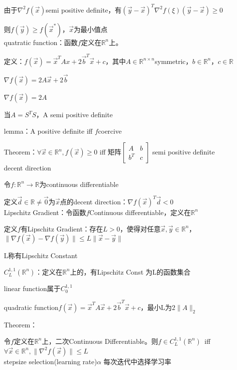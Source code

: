 \documentclass[UTF8]{ctexart}
\begin{document}
  \quad 由于$\nabla^2 f(\vec{x})$semi positive definite，有$(\vec{y} - \vec{x})^T\nabla^2 f(\xi) (\vec{y} - \vec{x}) \geq 0$

  \quad 则$f(\vec{y}) \geq f(\vec{x}^*)$，$\vec{x}$为最小值点\\
quatratic function：函数$f$定义在$\mathbb{R}^n$上。

  定义：$f(\vec{x}) = \vec{x}^TAx + 2\vec{b}^T\vec{x} + c$，其中$A \in \mathbb{R}^{n \times n}$symmetric，$b \in \mathbb{R}^n$，$c \in \mathbb{R} $

  \quad $\nabla f(\vec{x}) = 2A\vec{x} + 2\vec{b}$

  \quad $\nabla f(\vec{x}) = 2A$

  \quad 当$A = S^TS$，A semi positive definite

  lemma：A positive definite iff $f$coercive

  Theorem：$\forall \vec{x} \in \mathbb{R}^n, f(\vec{x}) \geq 0$ iff 矩阵$\begin{bmatrix}
    A & b \\
    b^T & c
    \end{bmatrix}$ semi positive definite\\
decent direction 

  令$f : \mathbb{R}^n \rightarrow \mathbb{R} $为continuous differentiable

  定义$\vec{d} \in \mathbb{R} \neq \vec{0}$为$\vec{x}$点的decent direction：$\nabla f(\vec{x})^T\vec{d} < 0$\\
Lipschitz Gradient：令函数$f$Continuous differentiable，定义在$\mathbb{R}^n$

  定义$f$有Lipschitz Gradient：存在$L > 0$，使得对任意$\vec{x}, \vec{y} \in \mathbb{R}^n$，$\|\nabla f(\vec{x}) - \nabla f(\vec{y})\| \leq L\|\vec{x} - \vec{y}\|$

  \quad L称有Lipschitz Constant

  $C^{1,1}_L(\mathbb{R}^n)$：定义在$\mathbb{R}^n$上的，有Lipschitz Const 为L的函数集合

  \quad linear function属于$C^{1,1}_0$

  \quad quadratic function$f(\vec{x}) = \vec{x}^TA\vec{x} + 2\vec{b}^T\vec{x} + c$，最小L为$2\|A\|_2$

  Theorem：

  \quad 令$f$定义在$\mathbb{R}^n$上，二次Continuous Differentiable。则$f \in C^{1,1}_L(\mathbb{R}^n)$\ iff\ $\forall \vec{x} \in \mathbb{R}^n, \|\nabla^2 f(\vec{x})\| \leq L$\\
stepsize selection(learning rate)$\alpha$ 每次迭代中选择学习率
\end{document}
